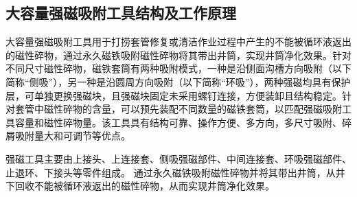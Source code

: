\subsection{大容量强磁吸附工具结构及工作原理}
\label{darongliangqiangci}
大容量强磁吸附工具用于打捞套管修复或清洁作业过程中产生的不能被循环液返出的磁性碎物，通过永久磁铁吸附磁性碎物将其带出井筒，实现井筒净化效果。针对不同尺寸磁性碎物，磁铁套筒有两种吸附模式，一种是沿侧面沟槽方向吸附（以下简称“侧吸”），另一种是沿圆周方向吸附（以下简称“环吸”），两种强磁均具有保护层，可单独更换强磁块，且强磁块固定未采用螺钉连接，方便装卸且结构稳定。针对套管中磁性碎物的含量，可以预先装配不同数量的磁铁套筒，以匹配强磁吸附工具容量和磁性碎物量。该工具具有结构可靠、操作方便、多方向，多尺寸吸附、碎屑吸附量大和可调节等优点。

强磁工具主要由上接头、上连接套、侧吸强磁部件、中间连接套、环吸强磁部件、止退环、下接头等零件组成。
通过永久磁铁吸附磁性碎物并将其带出井筒，从井下回收不能被循环液返出的磁性碎物，从而实现井筒净化效果。


